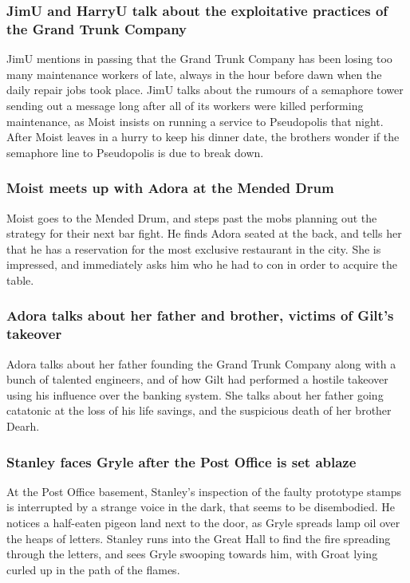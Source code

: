 \subsubsection{\Gls{JimU} and \Gls{HarryU} talk about the exploitative practices of the Grand Trunk
    Company}
\Gls{JimU} mentions in passing that the Grand Trunk Company has been losing too many maintenance
workers of late, always in the hour before dawn when the daily repair jobs took place. \Gls{JimU}
talks about the rumours of a semaphore tower sending out a message long after all of its workers
were killed performing maintenance, as \Gls{Moist} insists on running a service to Pseudopolis that
night. After \Gls{Moist} leaves in a hurry to keep his dinner date, the brothers wonder if the
semaphore line to Pseudopolis is due to break down.

\subsubsection{\Gls{Moist} meets up with \Gls{Adora} at the Mended Drum}
\Gls{Moist} goes to the Mended Drum, and steps past the mobs planning out the strategy for their
next bar fight. He finds \Gls{Adora} seated at the back, and tells her that he has a reservation
for the most exclusive restaurant in the city. She is impressed, and immediately asks him who he
had to con in order to acquire the table.

\subsubsection{\Gls{Adora} talks about her father and brother, victims of \Gls{Gilt}'s takeover}
\Gls{Adora} talks about her father founding the Grand Trunk Company along with a bunch of talented
engineers, and of how \Gls{Gilt} had performed a hostile takeover using his influence over the
banking system. She talks about her father going catatonic at the loss of his life savings, and the
suspicious death of her brother \Gls{Dearh}.

\subsubsection{\Gls{Stanley} faces \Gls{Gryle} after the Post Office is set ablaze}
At the Post Office basement, \Gls{Stanley}'s inspection of the faulty prototype stamps is
interrupted by a strange voice in the dark, that seems to be disembodied. He notices a half-eaten
pigeon land next to the door, as \Gls{Gryle} spreads lamp oil over the heaps of letters.
\Gls{Stanley} runs into the Great Hall to find the fire spreading through the letters, and sees
\Gls{Gryle} swooping towards him, with \Gls{Groat} lying curled up in the path of the flames.

